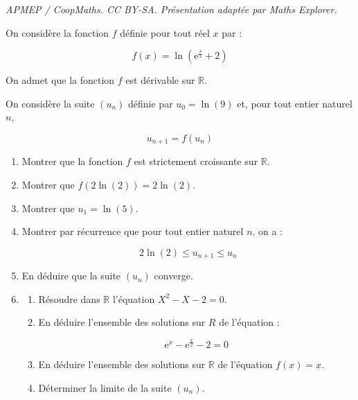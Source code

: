 \documentclass[10pt]{article}
\providecommand{\R}{\mathbb{R}}
\providecommand{\e}{{\mathrm{e}}}
\begin{document}
\noindent\textit{APMEP / CoopMaths. CC BY-SA. Présentation adaptée par Maths Explorer.}\par\medskip
On considère la fonction $f$ définie pour tout réel $x$ par :

\[ f(x) = \ln \left(\e^{\frac{x}{2}} + 2\right) \]

On admet que la fonction $f$ est dérivable sur $\mathbb{R}$.

On considère la suite $(u_{n})$ définie par $u_{0} = \ln (9)$ et, pour tout entier naturel $n$,

\[ u_{n+1} = f(u_{n}) \]

\smallskip

\begin{enumerate}
\item Montrer que la fonction $f$ est strictement croissante sur $\mathbb{R}$.
\item Montrer que $f(2\ln (2)) = 2\ln (2)$.
\item Montrer que $u_{1} = \ln (5)$.
\item Montrer par récurrence que pour tout entier naturel $n$, on a :

\[2\ln(2) \leqslant u_{n+1} \leqslant u_{n}\]

\item En déduire que la suite $(u_{n})$ converge.

\item
	\begin{enumerate}
		\item Résoudre dans $\R$ l'équation $X^{2} - X - 2 = 0$.
		\item En déduire l'ensemble des solutions sur $R$ de l'équation :

\[\e^{x} - \e^{\frac{x}{2}} - 2 = 0\]

		\item En déduire l'ensemble des solutions sur $\R$ de l'équation $f(x) = x$.
		\item Déterminer la limite de la suite $(u_{n})$.
	\end{enumerate}
\end{enumerate}
\end{document}
